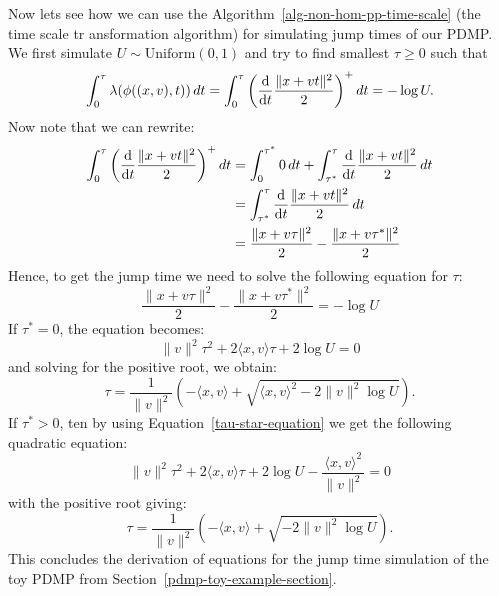 \documentclass[report.tex]{subfiles}
\begin{document}
Now lets see how we can use the Algorithm~\ref{alg-non-hom-pp-time-scale}
(the time scale tr  ansformation algorithm)
for simulating jump times of our PDMP. We first simulate
$U \sim \text{Uniform}(0, 1)$
and try to find smallest $\tau \geq 0$ such that
$$
\int_{{0}}^{{\tau}} {\lambda(\phi((x, v), t))}\, d{t}
= \int_{{0}}^{{\tau}} {\left( \dv{}{t} \frac{\lVert x + vt \rVert^{2}}{2} \right)^{+}}\, d{t}
= -\log U.
$$
Now note that we can rewrite:
\begin{align*}
  \int_{{0}}^{{\tau}} {\left( \dv{}{t} \frac{\lVert x + vt \rVert^{2}}{2} \right)^{+}}\, d{t}
  &= \int_{{0}}^{{\tau^{*}}} {0}\, d{t}
  + \int_{{\tau^{*}}}^{{\tau}} {\dv{}{t} \frac{\lVert x + vt \rVert^{2}}{2}}\, d{t} \\
  &= \int_{{\tau^{*}}}^{{\tau}} {\dv{}{t} \frac{\lVert x + vt \rVert^{2}}{2}}\, d{t} \\
  &= \frac{\lVert x + v\tau \rVert^{2}}{2} - \frac{\lVert x + v\tau^{*} \rVert^{2}}{2} \\
\end{align*}
Hence, to get the jump time we need to solve the following equation for $\tau$:
$$
  \frac{\lVert x + v\tau \rVert^{2}}{2} - \frac{\lVert x + v\tau^{*} \rVert^{2}}{2}
  = -\log U
$$
If $\tau^{*} = 0$, the equation becomes:
$$
\lVert v \rVert^{2} \tau^{2} + 2 \langle x, v \rangle \tau + 2 \log U = 0
$$
and solving for the positive root, we obtain:
$$
\tau = \frac{1}{\lVert v \rVert^{2}} \left( - \langle x, v \rangle + \sqrt{\langle x, v \rangle^{2} - 2 \lVert v \rVert^{2} \log U} \right).
$$
If $\tau^{*} > 0$, ten by using Equation~\ref{tau-star-equation} we get the following quadratic equation:
$$
\lVert v \rVert^{2} \tau^{2} + 2 \langle x, v \rangle \tau + 2 \log U - \frac{\langle x, v \rangle^{2}}{\lVert v  \rVert^{2}}= 0
$$
with the positive root giving:
$$
\tau = \frac{1}{\lVert v \rVert^{2}} \left( - \langle x, v \rangle + \sqrt{- 2 \lVert v \rVert^{2} \log U} \right).
$$
This concludes the derivation of equations for the jump time simulation of the toy PDMP from Section~\ref{pdmp-toy-example-section}.
\end{document}

